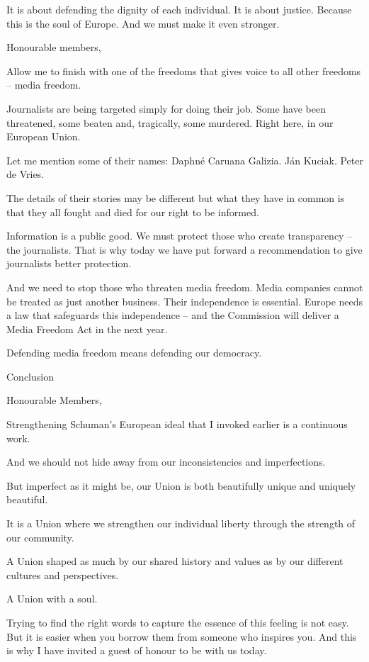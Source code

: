 \documentclass[a4paper,11pt]{article}
\begin{document}
It is about defending the dignity of each individual. It is about justice. Because this is the soul of Europe. And we must make it even stronger.

 

Honourable members,

Allow me to finish with one of the freedoms that gives voice to all other freedoms – media freedom.

Journalists are being targeted simply for doing their job. Some have been threatened, some beaten and, tragically, some murdered. Right here, in our European Union.

Let me mention some of their names: Daphné Caruana Galizia. Ján Kuciak. Peter de Vries.

The details of their stories may be different but what they have in common is that they all fought and died for our right to be informed.

Information is a public good. We must protect those who create transparency – the journalists. That is why today we have put forward a recommendation to give journalists better protection.

And we need to stop those who threaten media freedom. Media companies cannot be treated as just another business.  Their independence is essential. Europe needs a law that safeguards this independence – and the Commission will deliver a Media Freedom Act in the next year.

Defending media freedom means defending our democracy.

 

Conclusion

Honourable Members,

Strengthening Schuman's European ideal that I invoked earlier is a continuous work.

And we should not hide away from our inconsistencies and imperfections.

But imperfect as it might be, our Union is both beautifully unique and uniquely beautiful.

It is a Union where we strengthen our individual liberty through the strength of our community.

A Union shaped as much by our shared history and values as by our different cultures and perspectives.

A Union with a soul.

Trying to find the right words to capture the essence of this feeling is not easy. But it is easier when you borrow them from someone who inspires you. And this is why I have invited a guest of honour to be with us today.
\end{document}

